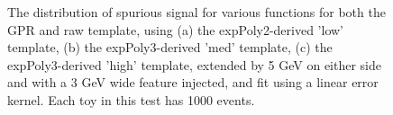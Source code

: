 \begin{figure} 
\begin{center}

\caption{The distribution of spurious signal for various functions for both the GPR and raw template, using (a) the expPoly2-derived 'low' template, (b) the expPoly3-derived 'med' template, (c) the expPoly3-derived 'high' template, extended by 5 GeV on either side and with a 3 GeV wide feature injected, and fit using a linear error kernel. Each toy in this test has 1000 events.}
\label{fig:linearkernel_lowpt_1000_Sig_1s}
\end{center}
\end{figure}

